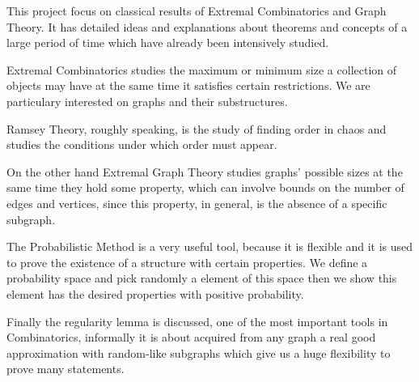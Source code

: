 \documentclass[12pt,twoside,a4paper,bibliography=totocnumbered]{book}
\numberwithin{equation}{section}
\theoremstyle{remark}
\begin{document}
This project focus on classical results of Extremal Combinatorics and Graph Theory. It has detailed ideas and explanations about theorems and concepts of a large period of time which have already been intensively studied.

Extremal Combinatorics studies the maximum or minimum size a collection of objects may have at the same time it satisfies certain restrictions. We are particulary interested on graphs and their substructures. 

Ramsey Theory, roughly speaking, is the study of finding order in chaos and studies the conditions under which order must appear.

On the other hand Extremal Graph Theory studies graphs' possible sizes at the same time they hold some property, which can involve bounds on the number of edges and vertices, since this property, in general, is the absence of a specific subgraph.

The Probabilistic Method is a very useful tool, because it is flexible and it is used to prove the existence of a structure with certain properties. We define a probability space and pick randomly a element of this space then we show this element has the desired properties with positive probability.

Finally the regularity lemma is discussed, one of the most important tools in Combinatorics, informally it is about acquired from any graph a real good approximation with random-like subgraphs which give us a huge flexibility to prove many statements.






\end{document}
